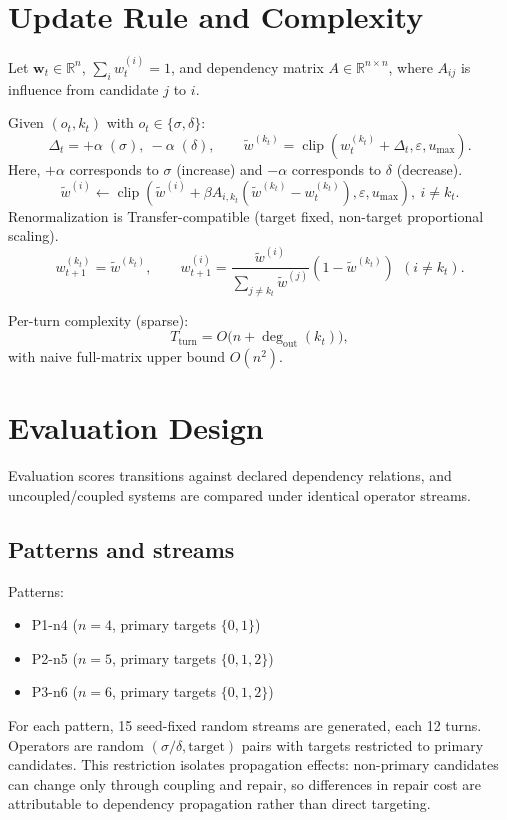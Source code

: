 \documentclass[11pt,a4paper]{article}
\begin{document}
\section{Update Rule and Complexity}
Let \(\mathbf{w}_t\in\mathbb{R}^n\), \(\sum_i w_t^{(i)}=1\), and dependency matrix \(A\in\mathbb{R}^{n\times n}\), where \(A_{ij}\) is influence from candidate \(j\) to \(i\).

Given \((o_t,k_t)\) with \(o_t\in\{\sigma,\delta\}\):
\[
\Delta_t = +\alpha\;(\sigma),\ -\alpha\;(\delta),\qquad
\tilde{w}^{(k_t)}=\operatorname{clip}(w_t^{(k_t)}+\Delta_t,\varepsilon,u_{\max}).
\]
Here, \(+\alpha\) corresponds to \(\sigma\) (increase) and \(-\alpha\) corresponds to \(\delta\) (decrease).
\[
\tilde{w}^{(i)} \leftarrow \operatorname{clip}(\tilde{w}^{(i)}+\beta A_{i,k_t}(\tilde{w}^{(k_t)}-w_t^{(k_t)}),\varepsilon,u_{\max}),\ i\neq k_t.
\]
Renormalization is Transfer-compatible (target fixed, non-target proportional scaling).
\[
w_{t+1}^{(k_t)}=\tilde{w}^{(k_t)},\qquad
w_{t+1}^{(i)}=\frac{\tilde{w}^{(i)}}{\sum_{j\neq k_t}\tilde{w}^{(j)}}\left(1-\tilde{w}^{(k_t)}\right)\ \ (i\neq k_t).
\]

Per-turn complexity (sparse):
\[
T_{\text{turn}}=O\big(n+\deg_{\text{out}}(k_t)\big),
\]
with naive full-matrix upper bound \(O(n^2)\).

\section{Evaluation Design}
Evaluation scores transitions against declared dependency relations, and uncoupled/coupled systems are compared under identical operator streams.

\subsection{Patterns and streams}
Patterns:
\begin{itemize}
  \item P1-n4 (\(n=4\), primary targets \(\{0,1\}\))
  \item P2-n5 (\(n=5\), primary targets \(\{0,1,2\}\))
  \item P3-n6 (\(n=6\), primary targets \(\{0,1,2\}\))
\end{itemize}
For each pattern, 15 seed-fixed random streams are generated, each 12 turns.
Operators are random \((\sigma/\delta,\text{target})\) pairs with targets restricted to primary candidates.
This restriction isolates propagation effects: non-primary candidates can change only through coupling and repair, so differences in repair cost are attributable to dependency propagation rather than direct targeting.
\end{document}
